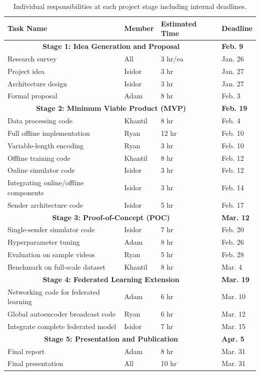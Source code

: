 \documentclass[letter, 12pt]{article}
\begin{document}
\begin{table}[h!]\centering
   \begin{tabular}{ |p{7.5cm}|p{1.5cm}|p{2.5cm}|p{2.5cm}|  }
\hline
Task Name & Member & Estimated Time & Deadline \\
\hline
\multicolumn{3}{|c|}{\textbf{Stage 1: Idea Generation and Proposal}} & \textbf{Feb. 9} \\
\hline
Research survey & All & 3 hr/ea & Jan. 26 \\
Project idea & Isidor & 3 hr & Jan. 27 \\
Architecture design & Isidor & 3 hr & Jan. 27 \\
Formal proposal & Adam & 8 hr & Feb. 3 \\
\hline
\multicolumn{3}{|c|}{\textbf{Stage 2: Minimum Viable Product (MVP)}} & \textbf{Feb. 19}\\
\hline
Data processing code & Khantil & 8 hr & Feb. 4 \\
Full offline implementation & Ryan & 12 hr & Feb. 10 \\
Variable-length encoding & Ryan & 3 hr & Feb. 10 \\
Offline training code & Khantil & 8 hr & Feb. 12 \\
Online simulator code & Isidor & 3 hr & Feb. 12 \\
Integrating online/offline components & Isidor & 3 hr & Feb. 14 \\
Sender architecture code & Isidor & 5 hr & Feb. 17 \\
\hline
\multicolumn{3}{|c|}{\textbf{Stage 3: Proof-of-Concept (POC)}} & \textbf{Mar. 12} \\
\hline
Single-sender simulator code & Isidor & 7 hr & Feb. 20 \\
Hyperparameter tuning & Adam & 8 hr & Feb. 26 \\
Evaluation on sample videos & Ryan & 5 hr & Feb. 28 \\
Benchmark on full-scale dataset & Khantil & 8 hr & Mar. 4 \\
\hline
\multicolumn{3}{|c|}{\textbf{Stage 4: Federated Learning Extension}} & \textbf{Mar. 19}\\
\hline
Networking code for federated learning & Adam & 6 hr & Mar. 10 \\
Global autoencoder broadcast code & Ryan & 6 hr & Mar. 12 \\
Integrate complete federated model & Isidor & 7 hr & Mar. 15 \\
\hline
\multicolumn{3}{|c|}{\textbf{Stage 5: Presentation and Publication}} & \textbf{Apr. 5} \\
\hline
Final report  & Adam & 8 hr & Mar. 31 \\
Final presentation  & All & 10 hr & Mar. 31 \\
\hline

\end{tabular} 
\caption{Individual responsibilities at each project stage including internal deadlines.}
\label{work}
\end{table}
\end{document}
